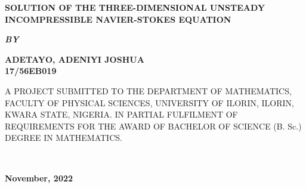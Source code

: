 \documentclass[11pt]{report}
\newcommand{\bt}[1]{\textbf{#1}}
\begin{document}
	
	\clearpage
	\thispagestyle{empty}
	\begin{center}
		\Large \bt{SOLUTION OF THE THREE-DIMENSIONAL UNSTEADY INCOMPRESSIBLE NAVIER-STOKES EQUATION}
	\end{center}

	\hspace{7cm}
	
	\begin{center}
		\textbf{\textit{BY}}
	\end{center}
	
	\hspace{5cm}
	
	\begin{center}
		\large \textbf{ADETAYO, ADENIYI JOSHUA
			\\
			17/56EB019}
	\end{center}
	
	\hspace{9cm}
	
	\begin{center}
		A PROJECT SUBMITTED TO THE DEPARTMENT OF MATHEMATICS, FACULTY OF PHYSICAL SCIENCES, UNIVERSITY OF ILORIN, ILORIN, KWARA STATE, NIGERIA. IN PARTIAL FULFILMENT OF REQUIREMENTS FOR THE AWARD OF BACHELOR OF SCIENCE (B. Sc.) DEGREE IN MATHEMATICS.
	\end{center}
	~~~~
	\hspace{11cm}
%	
	\begin{center}
		\textbf{November, 2022}
	\end{center}

	\newpage
\end{document}

